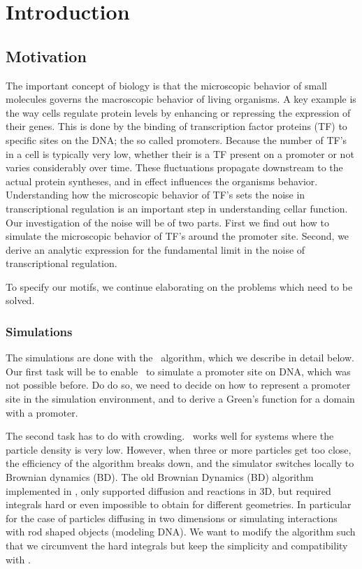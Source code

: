 \section{Introduction}

\subsection{Motivation}
The important concept of biology is that the microscopic behavior of small molecules governs the macroscopic behavior of living organisms. A key example is the way cells regulate protein levels by enhancing or repressing the expression of their genes. This is done by the binding of transcription factor proteins (TF) to specific sites on the DNA; the so called promoters. Because the number of TF's in a cell is typically very low, whether their is a TF present on a promoter or not varies considerably over time. These fluctuations propagate downstream to the actual protein syntheses, and in effect influences the organisms behavior. Understanding how the microscopic behavior of TF's sets the noise in transcriptional regulation is an important step in understanding cellar function. Our investigation of the noise will be of two parts. First we find out how to simulate the microscopic behavior of TF's around the promoter site. Second, we derive an analytic expression for the fundamental limit in the noise of transcriptional regulation. 

To specify our motifs, we continue elaborating on the problems which need to be solved.

\subsubsection{Simulations}
The simulations are done with the \GFRD\, algorithm, which we describe in detail below. Our first task will be to enable \GFRD\, to simulate a promoter site on DNA, which was not possible before. Do do so, we need to decide on how to represent a promoter site in the simulation environment, and to derive a Green's function for a domain with a promoter. 

The second task has to do with crowding. \GFRD\, works well for systems where the particle density is very low. However, when three or more particles get too close, the efficiency of the algorithm breaks down, and the simulator switches locally to Brownian dynamics (BD). The old Brownian Dynamics (BD) algorithm implemented in \GFRD \cite{Morelli2008a}, only supported diffusion and reactions in 3D, but required integrals hard or even impossible to obtain for different geometries. In particular for the case of particles diffusing in two dimensions or simulating interactions with rod shaped objects (modeling DNA). We want to modify the algorithm such that we circumvent the hard integrals but keep the simplicity and compatibility with \GFRD.

